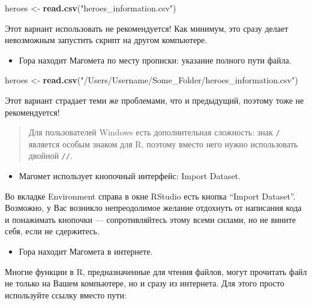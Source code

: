 \documentclass[]{book}
\newenvironment{Shaded}{\begin{snugshade}}{\end{snugshade}}
\newcommand{\KeywordTok}[1]{\textcolor[rgb]{0.13,0.29,0.53}{\textbf{#1}}}
\newcommand{\StringTok}[1]{\textcolor[rgb]{0.31,0.60,0.02}{#1}}
\newcommand{\NormalTok}[1]{#1}
\providecommand{\tightlist}{%
  \setlength{\itemsep}{0pt}\setlength{\parskip}{0pt}}
\begin{document}
\begin{Shaded}
\begin{Highlighting}[]
\NormalTok{heroes <-}\StringTok{ }\KeywordTok{read.csv}\NormalTok{(}\StringTok{"heroes_information.csv"}\NormalTok{)}
\end{Highlighting}
\end{Shaded}

Этот вариант использовать не рекомендуется! Как минимум, это сразу
делает невозможным запустить скрипт на другом компьютере.

\begin{itemize}
\tightlist
\item
  Гора находит Магомета по месту прописки: указание полного пути файла.
\end{itemize}

\begin{Shaded}
\begin{Highlighting}[]
\NormalTok{heroes <-}\StringTok{ }\KeywordTok{read.csv}\NormalTok{(}\StringTok{"/Users/Username/Some_Folder/heroes_information.csv"}\NormalTok{)}
\end{Highlighting}
\end{Shaded}

Этот вариант страдает теми же проблемами, что и предыдущий, поэтому тоже
не рекомендуется!

\begin{quote}
Для пользователей Windows есть дополнительная сложность: знак \texttt{/}
является особым знаком для R, поэтому вместо него нужно использовать
двойной \texttt{//}.
\end{quote}

\begin{itemize}
\tightlist
\item
  Магомет использует кнопочный интерфейс: Import Dataset.
\end{itemize}

Во вкладке Environment справа в окне RStudio есть кнопка ``Import
Dataset''. Возможно, у Вас возникло непреодолимое желание отдохнуть от
написания кода и понажимать кнопочки --- сопротивляйтесь этому всеми
силами, но не вините себя, если не сдержитесь.

\begin{itemize}
\tightlist
\item
  Гора находит Магомета в интернете.
\end{itemize}

Многие функции в R, предназначенные для чтения файлов, могут прочитать
файл не только на Вашем компьютере, но и сразу из интернета. Для этого
просто используйте ссылку вместо пути:
\end{document}
